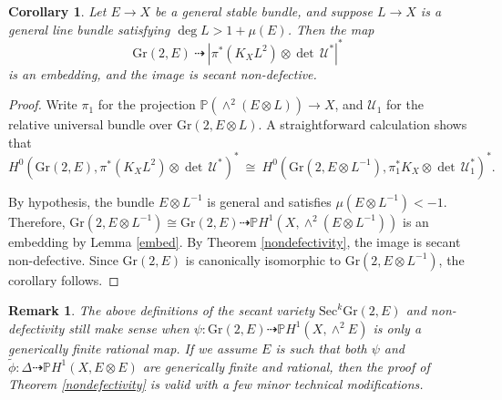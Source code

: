 \documentclass[10pt]{amsart}
\numberwithin{equation}{section}
\newcommand{\pp}{\mathbb P}
\newcommand{\Kx}{K_X}
\newcommand{\U}{\mathcal U}
\newcommand{\Sec}{\mathrm{Sec}}
\newcommand{\Gr}{\mathrm{Gr}}
\newtheorem{cor}[theorem]{{\textbf Corollary}}
\newtheorem{rmk}[theorem]{{\textbf Remark}}
\newenvironment{remark}{\begin{rmk}\rm}{\end{rmk}}
\begin{document}
\begin{cor} Let $E \to X$ be a general stable bundle, and suppose $L \to X$ is a general line bundle satisfying $\deg L > 1 + \mu(E)$. Then the map
\[ \Gr(2, E) \ \dashrightarrow \ |\pi^* (\Kx L^2) \otimes \det \, \U^*|^* \]
is an embedding, and the image is secant non-defective. \end{cor}
\begin{proof} Write $\pi_1$ for the projection $\pp(\wedge^2 (E \otimes L)) \to X$, and $\U_1$ for the relative universal bundle over $\Gr(2, E \otimes L)$. A straightforward calculation shows that
\[ H^0 ( \Gr(2, E) , \pi^* (\Kx L^2) \otimes \det \, \U^* ) ^* \ \cong \ H^0 ( \Gr(2, E \otimes L^{-1}) , \pi_1^* \Kx \otimes \det \, \U_1^* )^* . \]

By hypothesis, the bundle $E \otimes L^{-1}$ is general and satisfies $\mu (E \otimes L^{-1}) < -1$. Therefore, $\Gr (2, E \otimes L^{-1}) \cong \Gr (2, E) \dashrightarrow \pp H^1 (X, \wedge^2 (E \otimes L^{-1}))$ is an embedding by Lemma \ref{embed}. By Theorem \ref{nondefectivity}, the image is secant non-defective. Since $\Gr(2, E )$ is canonically isomorphic to $\Gr(2, E \otimes L^{-1})$, the corollary follows. \end{proof}

\begin{remark} \label{psinotemb} The above definitions of the secant variety $\Sec^k \Gr(2, E)$ and non-defectivity still make sense when $\psi \colon \Gr(2, E) \dashrightarrow \pp H^1 (X, \wedge^2 E)$ is only a generically finite rational map. If we assume $E$ is such that both $\psi$ and $\tilde{\phi} \colon \Delta \dashrightarrow \pp H^1 (X, E \otimes E)$ are generically finite and rational, then the proof of Theorem \ref{nondefectivity} is valid with a few minor technical modifications. \end{remark}
\end{document}
